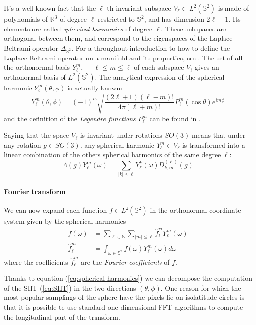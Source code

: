 It's a well known fact that the $\ell$-th invariant subspace $V_\ell\subset L^2(\mathbb S^2)$ is made of polynomials of $\mathbb R^3$ of degree $\ell$ restricted to $\mathbb S^2$, and has dimension $2\ell+1$. Its elements are called \textit{spherical harmonics} of degree $\ell$. These subspaces are orthogonal between them, and correspond to the eigenspaces of the Laplace-Beltrami operator $\Delta_{\mathbb S^2}$. For a throughout introduction to how to define the Laplace-Beltrami operator on a manifold and its properties, see \cite{rosenberg_1997}. The set of all the orthonormal basis $Y_\ell^m,\ -\ell\leq m\leq\ell$ of each subspace $V_\ell$ gives an orthonormal basis of $L^2(\mathbb S^2)$. The analytical expression of the spherical harmonic $Y_\ell^m(\theta, \phi)$ is actually known:
\begin{equation}\label{eq:spherical harmonics}
	Y_\ell^m(\theta, \phi) = (-1)^{m} \sqrt{\frac{(2 \ell+1)(\ell-m) !}{4 \pi(\ell+m) !}} P_{\ell}^{m}(\cos \theta) e^{i m \phi}
\end{equation}
and the definition of the \textit{Legendre functions} $P_{\ell}^{m}$ can be found in \cite{Driscoll:1994:CFT:184069.184073}. 
\vspace{0.5cm}
\begin{remark}
	Saying that the space $V_\ell$ is invariant under rotations $SO(3)$ means that under any rotation $g\in SO(3)$, any spherical harmonic $Y_\ell^m\in V_\ell$ is transformed into a linear combination of the others spherical harmonics of the same degree $\ell$:
	$$
	\Lambda(g) Y_{\ell}^{m}(\omega)=\sum_{|k| \leq \ell} Y_{\ell}^{k}(\omega) D_{k, m}^{(\ell)}(g)
	$$
\end{remark}
\vspace{0.5cm}

\paragraph{Fourier transform}
We can now expand each function $f\in L^2(\mathbb S^2)$ in the orthonormal coordinate system given by the spherical harmonics 
\begin{align}
	f(\omega) &= \sum_{\ell\in\mathbb N}\sum_{|m|\leq \ell}\hat f_\ell^mY_\ell^m(\omega)\\
	\hat f_\ell^m &=\int_{\omega\in\mathbb S^2}f(\omega)Y_\ell^m(\omega)d\omega \label{eq:SHT}
\end{align}
where the coefficients $\hat f_\ell^m$ are the \textit{Fourier coefficients} of $f$.

Thanks to equation (\ref{eq:spherical harmonics}) we can decompose the computation of the SHT (\ref{eq:SHT}) in the two directions $(\theta, \phi)$. One reason for which the most popular samplings of the sphere have the pixels lie on isolatitude circles is that it is possible to use standard one-dimensional FFT algorithms to compute the longitudinal part of the transform.

